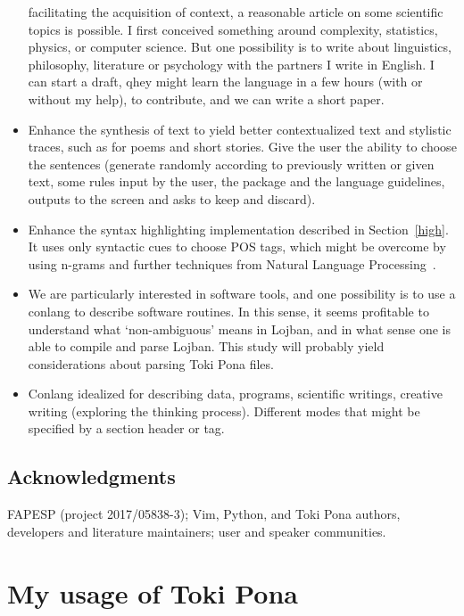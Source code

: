 \documentclass{article}
\begin{document}
\begin{itemize}
    facilitating the acquisition of context,
    a reasonable article on some scientific topics is
    possible.
    I first conceived something around complexity, statistics, physics, or computer science.
    But one possibility is to write about linguistics, philosophy, literature
    or psychology with the partners I write in English.
    I can start a draft,
    qhey might learn the language in a few hours (with or without my help),
    to contribute, and we can write a short paper.
  \item Enhance the synthesis of text to yield better contextualized text
    and stylistic traces, such as for poems and short stories.
    Give the user the ability to choose the sentences (generate randomly according to
    previously written or given text,
    some rules input by the user, the package and the language guidelines,
    outputs to the screen and asks to keep and discard).
  \item Enhance the syntax highlighting implementation described in Section~\ref{high}.
    It uses only syntactic cues to choose POS tags,
    which might be overcome by using n-grams and
    further techniques from Natural Language Processing~\cite{POS}.
  \item We are particularly interested in software tools,
    and one possibility is to use a conlang to describe software
    routines.
    In this sense, it seems profitable
    to understand what `non-ambiguous' means in Lojban,
    and in what sense one is able to compile and parse Lojban.
    This study will probably yield considerations about
    parsing Toki Pona files.
  \item Conlang idealized for describing data, programs,
    scientific writings, creative writing
    (exploring the thinking process).
    Different modes that might be specified by a section header or tag.
\end{itemize}

\subsection*{Acknowledgments}
FAPESP (project 2017/05838-3);
Vim, Python, and Toki Pona authors, developers and literature maintainers;
user and speaker communities. 

\appendix
\section{My usage of Toki Pona}\label{mytoki}
\end{document}
